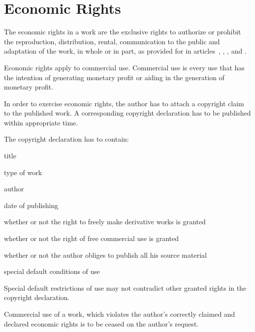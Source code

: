 \section{Economic Rights}
\begin{contract}

\label{Par:EconomicRightsGeneral}
\Sentence The economic rights in a work are the exclusive rights to authorize or 
prohibit the reproduction, distribution, rental, communication to the 
public and adaptation of the work, in whole or in part, as provided for in 
articles~, , ,  and .

\Sentence Economic rights apply to commercial use. Commercial use is every use that has the intention of generating monetary profit or aiding in the generation of monetary profit.

\label{Par:ClaimingAndDurationOfEconomicRights}
\Sentence In order to exercise economic rights, the author has to attach a copyright claim to the published work. \Sentence A corresponding copyright declaration has to be published within appropriate time. 

\Sentence The copyright declaration has to contain:
\begin{legalenum}
	\item title
	\item type of work
	\item author
	\item date of publishing
	\item whether or not the right to  freely make derivative works is granted
	\item whether or not the right of free commercial use is granted
	\item whether or not the author obliges to publish all his source material
	\item special default conditions of use
\end{legalenum}

\Sentence Special default restrictions of use may not contradict other granted rights in the copyright declaration.

\Sentence Commercial use of a work, which violates the author's correctly claimed and declared economic rights is to be ceased on the author's request. 


\end{contract}
